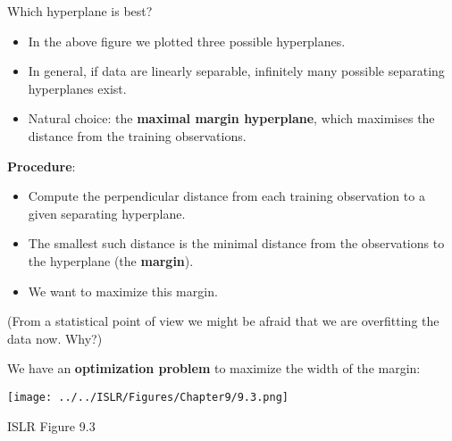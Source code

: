 \documentclass[10pt,ignorenonframetext,]{beamer}
\begin{document}
\begin{frame}

\begin{block}{Which hyperplane is best?}

\vspace{2mm}

\begin{itemize}
\item
  In the above figure we plotted three possible hyperplanes.
\item
  In general, if data are linearly separable, infinitely many possible
  separating hyperplanes exist.
\item
  Natural choice: the \textbf{maximal margin hyperplane}, which
  maximises the distance from the training observations.
\end{itemize}

\vspace{2mm}

\textbf{Procedure}:

\begin{itemize}
\item
  Compute the perpendicular distance from each training observation to a
  given separating hyperplane.
\item
  The smallest such distance is the minimal distance from the
  observations to the hyperplane (the \textbf{margin}).
\item
  We want to maximize this margin.
\end{itemize}

(From a statistical point of view we might be afraid that we are
overfitting the data now. Why?)

\end{block}

\end{frame}

\begin{frame}

We have an \textbf{optimization problem} to maximize the width of the
margin:

\centering
\texttt{[image: ../../ISLR/Figures/Chapter9/9.3.png]}
\small

ISLR Figure 9.3

\end{frame}
\end{document}

